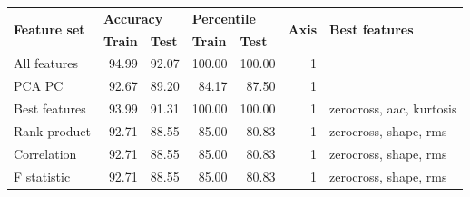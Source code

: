 \begin{table}[h]
\begin{adjustbox}{width=\textwidth}
\begin{tabular}{|l|rr|rr|r|l|}
\hline
\multirow{2}{*}{\textbf{Feature set}} & \multicolumn{2}{l|}{\textbf{Accuracy}}                                   & \multicolumn{2}{l|}{\textbf{Percentile}}                 & \multicolumn{1}{l|}{\multirow{2}{*}{\textbf{Axis}}} & \multirow{2}{*}{\textbf{Best features}} \\ \cline{2-5}
                                      & \multicolumn{1}{l|}{\textbf{Train}} & \multicolumn{1}{l|}{\textbf{Test}} & \multicolumn{1}{l|}{\textbf{Train}} & \multicolumn{1}{l|}{\textbf{Test}} & \multicolumn{1}{l|}{}                               &                                         \\ \hline
All features                          & \multicolumn{1}{r|}{94.99}          & 92.07                              & \multicolumn{1}{r|}{100.00}         & 100.00                             & 1                                                   &                                         \\ \hline
PCA PC                                & \multicolumn{1}{r|}{92.67}          & 89.20                              & \multicolumn{1}{r|}{84.17}          & 87.50                              & 1                                                   &                                         \\ \hline
Best features                         & \multicolumn{1}{r|}{93.99}          & 91.31                              & \multicolumn{1}{r|}{100.00}         & 100.00                             & 1                                                   & zerocross, aac, kurtosis                \\ \hline
Rank product                          & \multicolumn{1}{r|}{92.71}          & 88.55                              & \multicolumn{1}{r|}{85.00}          & 80.83                              & 1                                                   & zerocross, shape, rms                   \\ \hline
Correlation                           & \multicolumn{1}{r|}{92.71}          & 88.55                              & \multicolumn{1}{r|}{85.00}          & 80.83                              & 1                                                   & zerocross, shape, rms                   \\ \hline
F statistic                           & \multicolumn{1}{r|}{92.71}          & 88.55                              & \multicolumn{1}{r|}{85.00}          & 80.83                              & 1                                                   & zerocross, shape, rms                   \\ \hline

\end{tabular}
\end{adjustbox}
\end{table}
